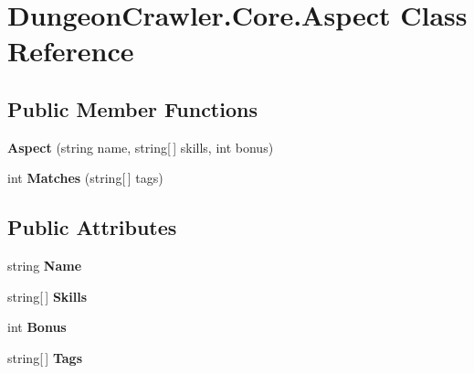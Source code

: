\hypertarget{class_dungeon_crawler_1_1_core_1_1_aspect}{}\section{Dungeon\+Crawler.\+Core.\+Aspect Class Reference}
\label{class_dungeon_crawler_1_1_core_1_1_aspect}
\subsection*{Public Member Functions}
\begin{DoxyCompactItemize}
\item 
\hypertarget{class_dungeon_crawler_1_1_core_1_1_aspect_a6205fbdf664eb5ec8955fd4576e5c503}{}{\bfseries Aspect} (string name, string\mbox{[}$\,$\mbox{]} skills, int bonus)\label{class_dungeon_crawler_1_1_core_1_1_aspect_a6205fbdf664eb5ec8955fd4576e5c503}

\item 
\hypertarget{class_dungeon_crawler_1_1_core_1_1_aspect_ab392c10aea5ca423c735d02a98ec4846}{}int {\bfseries Matches} (string\mbox{[}$\,$\mbox{]} tags)\label{class_dungeon_crawler_1_1_core_1_1_aspect_ab392c10aea5ca423c735d02a98ec4846}

\end{DoxyCompactItemize}
\subsection*{Public Attributes}
\begin{DoxyCompactItemize}
\item 
\hypertarget{class_dungeon_crawler_1_1_core_1_1_aspect_a34928312abdb48beae781b348e1b6d40}{}string {\bfseries Name}\label{class_dungeon_crawler_1_1_core_1_1_aspect_a34928312abdb48beae781b348e1b6d40}

\item 
\hypertarget{class_dungeon_crawler_1_1_core_1_1_aspect_a7f9cede50bd9f13359cf5d0c4b9e68d4}{}string\mbox{[}$\,$\mbox{]} {\bfseries Skills}\label{class_dungeon_crawler_1_1_core_1_1_aspect_a7f9cede50bd9f13359cf5d0c4b9e68d4}

\item 
\hypertarget{class_dungeon_crawler_1_1_core_1_1_aspect_a0dedd71fade2cc68e95d8145638145f9}{}int {\bfseries Bonus}\label{class_dungeon_crawler_1_1_core_1_1_aspect_a0dedd71fade2cc68e95d8145638145f9}

\item 
\hypertarget{class_dungeon_crawler_1_1_core_1_1_aspect_a4f275f0e7a11ed65fa69115a7200a757}{}string\mbox{[}$\,$\mbox{]} {\bfseries Tags}\label{class_dungeon_crawler_1_1_core_1_1_aspect_a4f275f0e7a11ed65fa69115a7200a757}

\end{DoxyCompactItemize}
